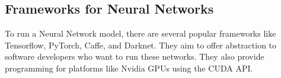 \begin{table}[]
    \centering
    \resizebox{.6\textwidth}{!}{%
    \begin{tabular}{ll}
    \hline
    \textbf{Activation Functions} & \textbf{Computation Equation} \\ \hline \hline
    Sigmoid                       &  $\displaystyle f(x)=\frac{1}{1+ e^{-x}}$                             \\ \hline
    Tanh                          &  $\displaystyle f(x)=\frac{e^{x}-e^{-x}}{e^{x}+e^{-x}}$                            \\ \hline
    Softmax                       &  $\displaystyle f(x_{i})=\frac{x_{i}}{\sum_{j}e^{x_{j}}}$                             \\ \hline
    ReLU                          &    $ f(x)=\begin{matrix}
        x & if & x\geq 0  \\ 
        0 & if & x< 0 
    \end{matrix} $                           \\ \hline
    LReLU                         &  $f(x)= \begin{matrix}
        x & if & x > 0  \\ 
        \alpha x & if & x \leq 0 
    \end{matrix} $                        \\ \hline
    ELU                           &             $ f(x)=\begin{matrix}
        x & if & x> 0  \\ 
        \alpha e^{x} - 1 & if & x\leq 0 
    \end{matrix} $                 \\ \hline
    \end{tabular}%
    }
    \caption{Popular activation functions}
    \label{table:AF}
\end{table}



 \subsection{Frameworks for Neural Networks}
 \label{section:Darknet}

To run a Neural Network model, there are several popular frameworks like
Tensorflow, PyTorch, Caffe, and Darknet.  They aim to offer abstraction
to software developers who want to run these networks. They also provide
programming for platforms like Nvidia GPUs using the CUDA API.

